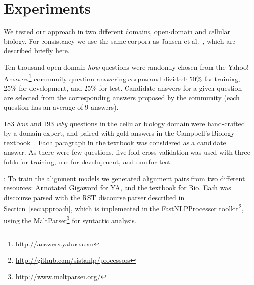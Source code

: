 \section{Experiments}
\label{sec:experiments}



We tested our approach in two different domains, open-domain and cellular biology. For consistency we use the same corpora as Jansen et al.~, which are described briefly here. 

{}  Ten thousand open-domain \emph{how} questions were randomly chosen from the Yahoo! Answers\footnote{\url{http://answers.yahoo.com}} community question answering corpus and divided: 50\% for training, 25\% for development, and 25\% for test.  Candidate answers for a given question are selected from the corresponding answers proposed by the community (each question has an average of 9 answers).

{} 183 \emph{how} and 193 \emph{why}  questions in the cellular biology domain were hand-crafted by a domain expert, and paired with gold answers in the Campbell's Biology textbook~\cite{Reece:2011}.  Each paragraph in the textbook was considered as a candidate answer.  As there were few questions, five fold cross-validation was used with three folds for training, one for development, and one for test.


{}: To train the alignment models we generated alignment pairs from two different resources: Annotated Gigaword \cite{Napoles2012} for YA, and the textbook for Bio.  Each was discourse parsed with the RST discourse parser described in Section~\ref{sec:approach}, which is implemented in the FastNLPProcessor toolkit\footnote{\url{http://github.com/sistanlp/processors}}, using the MaltParser\footnote{\url{http://www.maltparser.org/}} for syntactic analysis.



